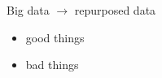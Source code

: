 \documentclass[aspectratio=169]{beamer}
\begin{document}
\begin{frame}

Big data $\rightarrow$ repurposed data
\pause
\begin{itemize}
\item good things
\item bad things
\end{itemize}

\end{frame}
\end{document}
